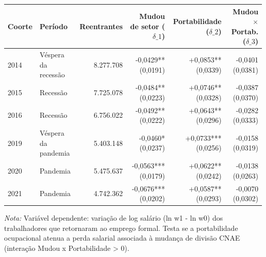 \providecommand{\toprule}{\hline\hline}
\providecommand{\midrule}{\hline}
\providecommand{\bottomrule}{\hline\hline}
\providecommand{\addlinespace}[1][]{}
{\small
\renewcommand{\arraystretch}{1.12}
\begin{tabular}{llrrrr}
\toprule
Coorte & Período & Reentrantes & Mudou de setor ($\delta\_1$) & Portabilidade ($\delta\_2$) & Mudou $\times$ Portab. ($\delta\_3$) \\
\midrule
2014 & Véspera da recessão & 8.277.708 & -0,0429** (0,0191) & +0,0853** (0,0339) & -0,0401 (0,0381) \\
2015 & Recessão & 7.725.078 & -0,0484** (0,0223) & +0,0746** (0,0328) & -0,0387 (0,0370) \\
2016 & Recessão & 6.756.022 & -0,0492** (0,0222) & +0,0643** (0,0296) & -0,0282 (0,0333) \\
2019 & Véspera da pandemia & 5.403.148 & -0,0460* (0,0237) & +0,0733*** (0,0256) & -0,0158 (0,0319) \\
2020 & Pandemia & 5.475.637 & -0,0563*** (0,0179) & +0,0622** (0,0242) & -0,0138 (0,0263) \\
2021 & Pandemia & 4.742.362 & -0,0676*** (0,0202) & +0,0587** (0,0293) & -0,0070 (0,0302) \\
\bottomrule
\end{tabular}
\vspace{2pt}
\par{\footnotesize \textit{Nota:} Variável dependente: variação de log salário (ln w1 - ln w0) dos trabalhadores que retornaram ao emprego formal. Testa se a portabilidade ocupacional atenua a perda salarial associada à mudança de divisão CNAE (interação Mudou x Portabilidade > 0).}
}
